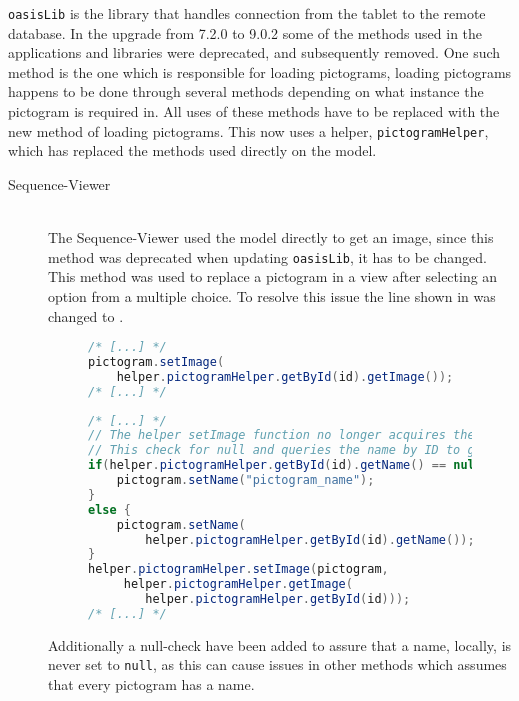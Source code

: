 \texttt{oasisLib} is the library that handles connection from the tablet to the remote database.
In the upgrade from 7.2.0 to 9.0.2 some of the methods used in the applications and libraries were deprecated, and subsequently removed. 
One such method is the one which is responsible for loading pictograms, loading pictograms happens to be done through several methods depending on what instance the pictogram is required in. 
All uses of these methods have to be replaced with the new method of loading pictograms. 
This now uses a helper, \texttt{pictogramHelper}, which has replaced the methods used directly on the model. 
  
\begin{description} 
    \item[Sequence-Viewer] \hfill \\ 
    The Sequence-Viewer used the model directly to get an image, since this method was deprecated when updating \texttt{oasisLib}, it has to be changed. 
    This method was used to replace a pictogram in a view after selecting an option from a multiple choice. 
    To resolve this issue the line shown in  was changed to . 
     \begin{figure} 
        \begin{lstlisting}[firstnumber=1,language=java, caption={Sequence-Viewer with deprecated method call. }, label=lst:dep-sv-prev] 
/* [...] */ 
pictogram.setImage( 
    helper.pictogramHelper.getById(id).getImage()); 
/* [...] */ 
        \end{lstlisting} 
    \end{figure} 
    \begin{figure} 
        \begin{lstlisting}[firstnumber=1,language=java, caption={Sequence-Viewer replacement code. }, label=lst:dep-sv-upd] 
/* [...] */ 
// The helper setImage function no longer acquires the pictogram name and causes null exception error 
// This check for null and queries the name by ID to get name 
if(helper.pictogramHelper.getById(id).getName() == null) { 
    pictogram.setName("pictogram_name"); 
} 
else { 
    pictogram.setName( 
        helper.pictogramHelper.getById(id).getName()); 
} 
helper.pictogramHelper.setImage(pictogram, 
     helper.pictogramHelper.getImage( 
        helper.pictogramHelper.getById(id))); 
/* [...] */ 
        \end{lstlisting} 
    \end{figure} 
    Additionally a null-check have been added to assure that a name, locally, is never set to \texttt{null}, as this can cause issues in other methods which assumes that every pictogram has a name. 

\end{description}
